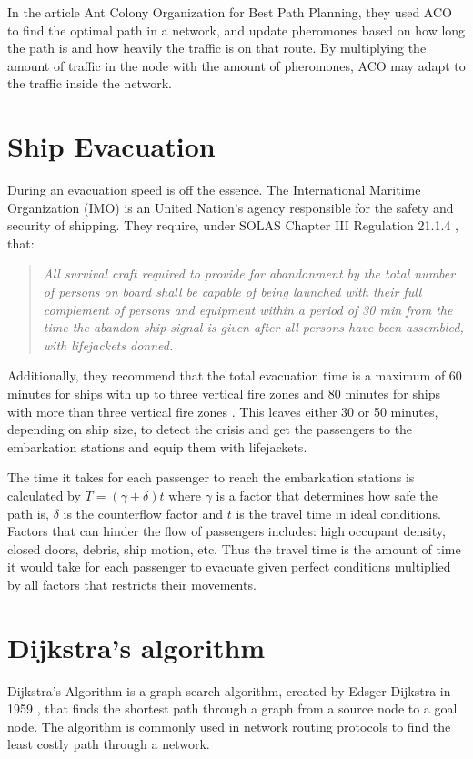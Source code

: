 In the article Ant Colony Organization for Best Path Planning\cite{acobpp:2004}, they used ACO to find the optimal path in a network, and update pheromones based on how long the path is and how heavily the traffic is on that route. By multiplying the amount of traffic in the node with the amount of pheromones, ACO may adapt to the traffic inside the network.

\section{Ship Evacuation}

During an evacuation speed is off the essence. The International Maritime Organization (IMO) is an United Nation's agency responsible for
the safety and security of shipping. They require, under SOLAS Chapter III Regulation 21.1.4 \cite{imo}, that: 
\begin{quotation}
\textit{All survival craft required to provide for abandonment by the total number of persons on board shall be capable of being launched with their full complement of persons and equipment within a period of 30 min from the time the abandon ship signal is given after all persons have been assembled, with lifejackets donned.}
\end{quotation}
Additionally, they recommend that the total evacuation time is a maximum of 60 minutes for ships with up to three vertical fire zones and
80 minutes for ships with more than three vertical fire zones \cite{total}. This leaves either 30 or 50 minutes, depending on ship size, to detect the crisis and get the passengers to the embarkation stations and equip them with lifejackets.

The time it takes for each passenger to reach the embarkation stations is calculated by $T = (\gamma + \delta) t$ where $\gamma$ is a factor that determines how safe the path is, $\delta$ is the counterflow factor and $t$ is the travel time in ideal conditions. Factors that can hinder the flow of passengers includes: high occupant density, closed doors, debris, ship motion, etc. Thus the travel time is the amount of time it would take for each passenger to evacuate given perfect conditions multiplied by all factors that restricts their movements. 

\section{Dijkstra's algorithm}
Dijkstra's Algorithm is a graph search algorithm, created by Edsger Dijkstra in 1959 \cite{Misa}, that finds the shortest path through a graph from a source node to a goal node. The algorithm is commonly used in network routing protocols to find the least costly path through a network. 

